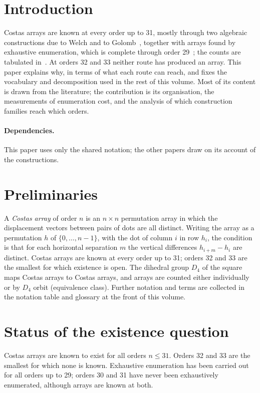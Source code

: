 \documentclass[11pt,a4paper,oneside]{report}
\theoremstyle{definition}
\begin{document}
\section{Introduction}\label{p1-sec:paperintro}
Costas arrays are known at every order up to 31, mostly through two algebraic constructions
due to Welch and to Golomb~\cite{p1-golombtaylor}, together with arrays found by exhaustive enumeration, which is complete through order 29~\cite{p1-drakakis27,p1-drakakis28,p1-drakakis29}; the counts are tabulated in~\cite{p1-oeis}. At orders 32 and 33 neither route has produced an array. This paper explains why,
in terms of what each route can reach, and fixes the vocabulary and decomposition used in the rest
of this volume. Most of its content is drawn from the literature; the contribution is its
organisation, the measurements of enumeration cost, and the analysis of which construction
families reach which orders.

\paragraph{Dependencies.} This paper uses only the shared notation; the other papers draw on its account of the constructions.

\section{Preliminaries}\label{p1-sec:notation}
A \emph{Costas array} of order $n$ is an $n\times n$ permutation array in which the displacement
vectors between pairs of dots are all distinct. Writing the array as a permutation $h$ of
$\{0,\dots,n-1\}$, with the dot of column $i$ in row $h_i$, the condition is that for each
horizontal separation $m$ the vertical differences $h_{i+m}-h_i$ are distinct. Costas arrays are
known at every order up to 31; orders 32 and 33 are the smallest for which existence is open. The
dihedral group $D_4$ of the square maps Costas arrays to Costas arrays, and arrays are counted
either individually or by $D_4$ orbit (equivalence class). Further notation and terms are collected
in the notation table and glossary at the front of this volume.


\section{Status of the existence question}

Costas arrays are known to exist for all orders $n \le 31$. Orders 32 and 33 are
the smallest for which none is known. Exhaustive enumeration has been carried
out for all orders up to 29; orders 30 and 31 have never been exhaustively
enumerated, although arrays are known at both.
\end{document}
